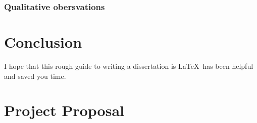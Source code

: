\documentclass[12pt,a4paper,twoside,openright]{report}
\begin{document}


\subsection{Qualitative obersvations}




\chapter{Conclusion}

I hope that this rough guide to writing a dissertation is \LaTeX\ has
been helpful and saved you time.




\appendix








\chapter{Project Proposal}


\end{document}
